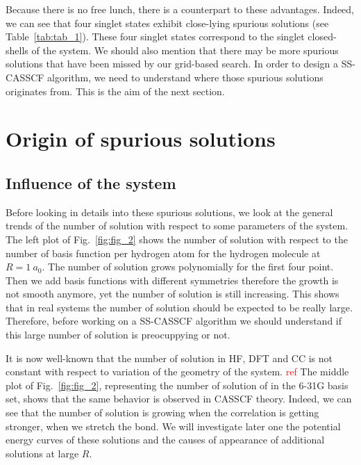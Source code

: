 \documentclass[aps,prb,reprint,showkeys,superscriptaddress]{revtex4-1}
\newcommand{\todo}[1]{\textcolor{red}{#1}}
\begin{document}
Because there is no free lunch, there is a counterpart to these advantages. Indeed, we can see that four singlet states exhibit close-lying spurious solutions (see Table~\ref{tab:tab_1}).
These four singlet states correspond to the singlet closed-shells of the system.
We should also mention that there may be more spurious solutions that have been missed by our grid-based search.
In order to design a SS-CASSCF algorithm, we need to understand where those spurious solutions originates from.
This is the aim of the next section.

\section{Origin of spurious solutions}
\label{sec:origin}

\subsection{Influence of the system}
\label{sec:influence}

Before looking in details into these spurious solutions, we look at the general trends of the number of solution with respect to some parameters of the system.
The left plot of Fig.~\ref{fig:fig_2} shows the number of solution with respect to the number of basis function per hydrogen atom for the hydrogen molecule at $R=1~a_0$.
The number of solution grows polynomially for the first four point.
Then we add basis functions with different symmetries therefore the growth is not smooth anymore, yet the number of solution is still increasing.
This shows that in real systems the number of solution should be expected to be really large.
Therefore, before working on a SS-CASSCF algorithm we should understand if this large number of solution is preocuppying or not.

It is now well-known that the number of solution in HF, DFT and CC is not constant with respect to variation of the geometry of the system. \todo{ref}
The middle plot of Fig.~\ref{fig:fig_2}, representing the number of solution of  in the 6-31G basis set, shows that the same behavior is observed in CASSCF theory.
Indeed, we can see that the number of solution is growing when the correlation is getting stronger, \ie when we stretch the bond.
We will investigate later one the potential energy curves of these solutions and the causes of appearance of additional solutions at large $R$.
\end{document}
